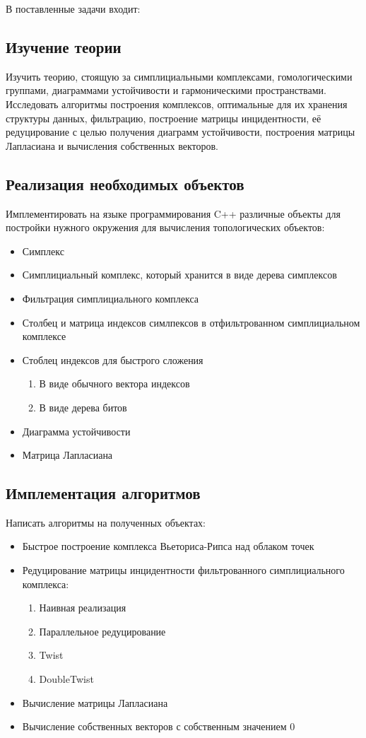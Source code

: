 \documentclass{article}
\begin{document}
В поставленные задачи входит:
\subsection*{Изучение теории}
Изучить теорию, стоящую за симплициальными комплексами, гомологическими группами, диаграммами устойчивости и гармоническими пространствами. Исследовать алгоритмы построения комплексов, оптимальные для их хранения структуры данных, фильтрацию, построение матрицы инцидентности, её редуцирование с целью получения диаграмм устойчивости, построения матрицы Лапласиана и вычисления собственных векторов.
\subsection*{Реализация необходимых объектов}
Имплементировать на языке программирования C++ различные объекты для постройки нужного окружения для вычисления топологических объектов:
\begin{itemize}
  \item Симплекс
  \item Симплициальный комплекс, который хранится в виде дерева симплексов \cite{simplextree}
  \item Фильтрация симплициального комплекса
  \item Столбец и матрица индексов симлпексов в отфильтрованном симплициальном комплексе
  \item Стоблец индексов для быстрого сложения
    \begin{enumerate}
      \item В виде обычного вектора индексов
      \item В виде дерева битов \cite{bittreecolumn}
    \end{enumerate}
  \item Диаграмма устойчивости
  \item Матрица Лапласиана \cite{laplacianmatrix}
\end{itemize}

\subsection*{Имплементация алгоритмов}
Написать алгоритмы на полученных объектах:
\begin{itemize}
  \item Быстрое построение комплекса Вьеториса-Рипса над облаком точек \cite{fastvr}
  \item Редуцирование матрицы инцидентности фильтрованного симплициального комплекса:
  \begin{enumerate}
    \item Наивная реализация
    \item Параллельное редуцирование \cite{parallelreduce}
    \item Twist \cite{twist}
    \item DoubleTwist \cite{doubletwist}
  \end{enumerate}
  \item Вычисление матрицы Лапласиана
  \item Вычисление собственных векторов с собственным значением 0
\end{itemize}
\end{document}
